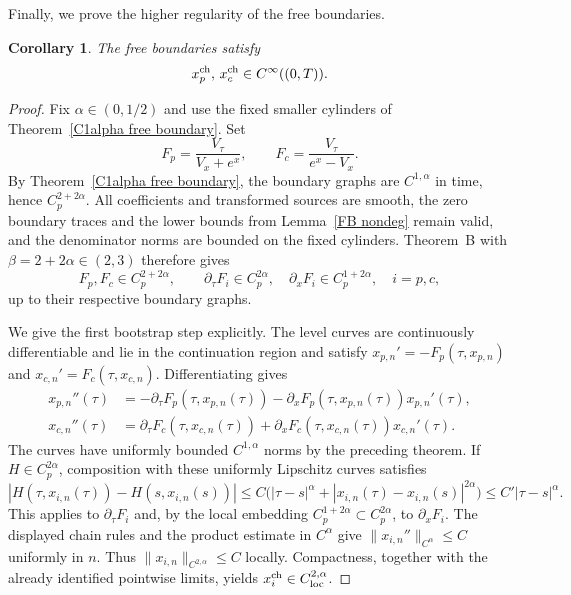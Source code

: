 \documentclass[11pt, a4paper, leqno]{amsart}
\numberwithin{equation}{section}
\theoremstyle{plain}
\newtheorem{corollary}[theorem]{Corollary}
\theoremstyle{definition}
\theoremstyle{remark}
\def\leq{\leqslant}
\begin{document}
{Finally, we prove the higher regularity of the free boundaries.

\begin{corollary}\label{smooth free boundary}
The free boundaries satisfy
\[
    x_p^{\rm ch},\,x_c^{\rm ch}\in C^\infty((0,T)).
\]
\end{corollary}

\begin{proof}
{
Fix $\alpha\in(0,1/2)$ and use the fixed smaller cylinders of
Theorem~\ref{C1alpha free boundary}. Set
\[
 F_p=\frac{V_\tau}{V_x+e^x},\qquad
 F_c=\frac{V_\tau}{e^x-V_x}.
\]
By Theorem~\ref{C1alpha free boundary}, the boundary graphs are
$C^{1,\alpha}$ in time, hence $C_p^{2+2\alpha}$.
All coefficients and transformed sources are smooth, the zero
boundary traces and the lower bounds from Lemma~\ref{FB nondeg}
remain valid, and the denominator norms are bounded on the fixed
cylinders. Theorem~B with $\beta=2+2\alpha\in(2,3)$ therefore gives
\[
 F_p,F_c\in C_p^{2+2\alpha},\qquad
 \partial_\tau F_i\in C_p^{2\alpha},\quad
 \partial_xF_i\in C_p^{1+2\alpha},\quad i=p,c,
\]
up to their respective boundary graphs.

We give the first bootstrap step explicitly. The level curves are
continuously differentiable and lie in the continuation region and satisfy
$x_{p,n}'=-F_p(\tau,x_{p,n})$ and
$x_{c,n}'=F_c(\tau,x_{c,n})$. Differentiating gives
\[
\begin{aligned}
 x_{p,n}''(\tau)
 &=-\partial_\tau F_p(\tau,x_{p,n}(\tau))
   -\partial_xF_p(\tau,x_{p,n}(\tau))x_{p,n}'(\tau),\\
 x_{c,n}''(\tau)
 &=\partial_\tau F_c(\tau,x_{c,n}(\tau))
   +\partial_xF_c(\tau,x_{c,n}(\tau))x_{c,n}'(\tau).
\end{aligned}
\]
The curves have uniformly bounded $C^{1,\alpha}$ norms by the
preceding theorem. If $H\in C_p^{2\alpha}$, composition with these
uniformly Lipschitz curves satisfies
\[
 |H(\tau,x_{i,n}(\tau))-H(s,x_{i,n}(s))|
 \leq C\bigl(|\tau-s|^\alpha+
             |x_{i,n}(\tau)-x_{i,n}(s)|^{2\alpha}\bigr)
 \leq C'|\tau-s|^\alpha.
\]
This applies to $\partial_\tau F_i$ and, by the local embedding
$C_p^{1+2\alpha}\subset C_p^{2\alpha}$, to $\partial_xF_i$.
The displayed chain rules and the product estimate in $C^\alpha$
give $\|x_{i,n}''\|_{C^\alpha}\leq C$ uniformly in $n$.
Thus $\|x_{i,n}\|_{C^{2,\alpha}}\leq C$ locally. Compactness,
together with the already identified pointwise limits, yields
$x_i^{\rm ch}\in C^{2,\alpha}_{\rm loc}$.

}
\end{proof}}
\end{document}
